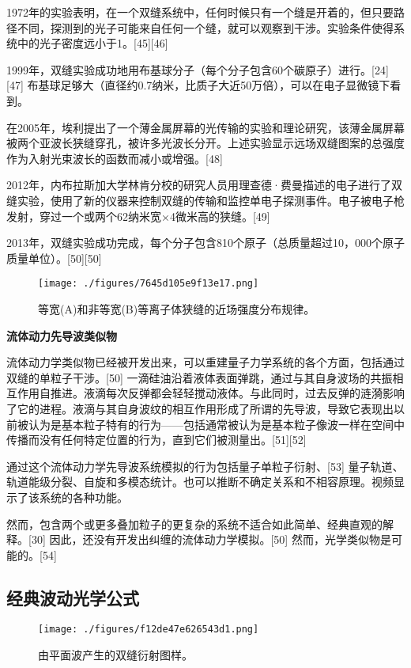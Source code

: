 1972年的实验表明，在一个双缝系统中，任何时候只有一个缝是开着的，但只要路径不同，探测到的光子可能来自任何一个缝，就可以观察到干涉。实验条件使得系统中的光子密度远小于1。[45][46]

1999年，双缝实验成功地用布基球分子（每个分子包含60个碳原子）进行。[24][47] 布基球足够大（直径约0.7纳米，比质子大近50万倍），可以在电子显微镜下看到。

在2005年，埃利提出了一个薄金属屏幕的光传输的实验和理论研究，该薄金属屏幕被两个亚波长狭缝穿孔，被许多光波长分开。上述实验显示远场双缝图案的总强度作为入射光束波长的函数而减小或增强。[48]

2012年，内布拉斯加大学林肯分校的研究人员用理查德·费曼描述的电子进行了双缝实验，使用了新的仪器来控制双缝的传输和监控单电子探测事件。电子被电子枪发射，穿过一个或两个62纳米宽×4微米高的狭缝。[49]

2013年，双缝实验成功完成，每个分子包含810个原子（总质量超过10，000个原子质量单位）。[50][50]
\begin{figure}[ht]
\centering
\texttt{[image: ./figures/7645d105e9f13e17.png]}
\caption{等宽(A)和非等宽(B)等离子体狭缝的近场强度分布规律。} \label{fig_SFSY_6}
\end{figure}

\textbf{流体动力先导波类似物}

流体动力学类似物已经被开发出来，可以重建量子力学系统的各个方面，包括通过双缝的单粒子干涉。[50] 一滴硅油沿着液体表面弹跳，通过与其自身波场的共振相互作用自推进。液滴每次反弹都会轻轻搅动液体。与此同时，过去反弹的涟漪影响了它的进程。液滴与其自身波纹的相互作用形成了所谓的先导波，导致它表现出以前被认为是基本粒子特有的行为——包括通常被认为是基本粒子像波一样在空间中传播而没有任何特定位置的行为，直到它们被测量出。[51][52]

通过这个流体动力学先导波系统模拟的行为包括量子单粒子衍射、[53] 量子轨道、轨道能级分裂、自旋和多模态统计。也可以推断不确定关系和不相容原理。视频显示了该系统的各种功能。

然而，包含两个或更多叠加粒子的更复杂的系统不适合如此简单、经典直观的解释。[30] 因此，还没有开发出纠缠的流体动力学模拟。[50] 然而，光学类似物是可能的。[54]

\subsection{经典波动光学公式}
\begin{figure}[ht]
\centering
\texttt{[image: ./figures/f12de47e626543d1.png]}
\caption{由平面波产生的双缝衍射图样。} \label{fig_SFSY_7}
\end{figure}
